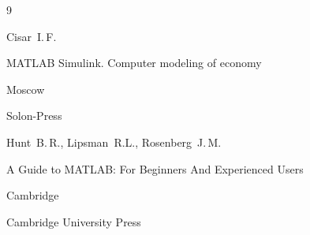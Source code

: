 \begin{thebibliography}{9}


\misctransl

\by Cisar~I.\,F.

\book MATLAB Simulink. Computer modeling of economy

\publaddr Moscow

\publ Solon-Press






\by Hunt~B.\,R., Lipsman~R.L., Rosenberg~J.\,M. 

\book A Guide to MATLAB: For Beginners And Experienced Users

\publaddr Cambridge

\publ Cambridge University Press





\end{thebibliography}

\noindent

\hskip6.5cm \thedate \par\noindent

\hskip6.5cm\therevdate









\makeengtitlem





\newpage



%

